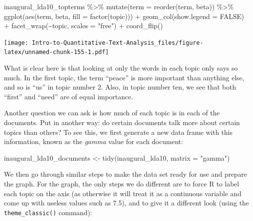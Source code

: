 \documentclass[
]{article}
\newenvironment{Shaded}{\begin{snugshade}}{\end{snugshade}}
\newcommand{\AttributeTok}[1]{\textcolor[rgb]{0.77,0.63,0.00}{#1}}
\newcommand{\ConstantTok}[1]{\textcolor[rgb]{0.00,0.00,0.00}{#1}}
\newcommand{\FunctionTok}[1]{\textcolor[rgb]{0.00,0.00,0.00}{#1}}
\newcommand{\NormalTok}[1]{#1}
\newcommand{\OtherTok}[1]{\textcolor[rgb]{0.56,0.35,0.01}{#1}}
\newcommand{\SpecialCharTok}[1]{\textcolor[rgb]{0.00,0.00,0.00}{#1}}
\newcommand{\StringTok}[1]{\textcolor[rgb]{0.31,0.60,0.02}{#1}}
\begin{document}
\begin{Shaded}
\begin{Highlighting}[]
\NormalTok{inaugural\_lda10\_topterms }\SpecialCharTok{\%\textgreater{}\%}
    \FunctionTok{mutate}\NormalTok{(}\AttributeTok{term =} \FunctionTok{reorder}\NormalTok{(term, beta)) }\SpecialCharTok{\%\textgreater{}\%}
    \FunctionTok{ggplot}\NormalTok{(}\FunctionTok{aes}\NormalTok{(term, beta, }\AttributeTok{fill =} \FunctionTok{factor}\NormalTok{(topic))) }\SpecialCharTok{+} \FunctionTok{geom\_col}\NormalTok{(}\AttributeTok{show.legend =} \ConstantTok{FALSE}\NormalTok{) }\SpecialCharTok{+}
    \FunctionTok{facet\_wrap}\NormalTok{(}\SpecialCharTok{\textasciitilde{}}\NormalTok{topic, }\AttributeTok{scales =} \StringTok{"free"}\NormalTok{) }\SpecialCharTok{+} \FunctionTok{coord\_flip}\NormalTok{()}
\end{Highlighting}
\end{Shaded}

\texttt{[image: Intro-to-Quantitative-Text-Analysis\_files/figure-latex/unnamed-chunk-155-1.pdf]}

What is clear here is that looking at only the words in each topic only says so much. In the first topic, the term ``peace'' is more important than anything else, and so is ``us'' in topic number 2. Also, in topic number ten, we see that both ``first'' and ``need'' are of equal importance.

Another question we can ask is how much of each topic is in each of the documents. Put in another way: do certain documents talk more about certain topics than others? To see this, we first generate a new data frame with this information, known as the \emph{gamma} value for each document:

\begin{Shaded}
\begin{Highlighting}[]
\NormalTok{inaugural\_lda10\_documents }\OtherTok{\textless{}{-}} \FunctionTok{tidy}\NormalTok{(inaugural\_lda10, }\AttributeTok{matrix =} \StringTok{"gamma"}\NormalTok{)}
\end{Highlighting}
\end{Shaded}

We then go through similar steps to make the data set ready for use and prepare the graph. For the graph, the only steps we do different are to force R to label each topic on the axis (as otherwise it will treat it as a continuous variable and come up with useless values such as 7.5), and to give it a different look (using the \texttt{theme\_classic()} command):
\end{document}
